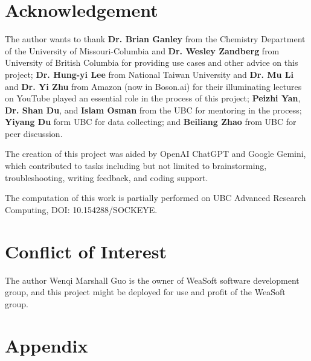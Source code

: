 \documentclass[12pt]{article}
\begin{document}
\section*{Acknowledgement}
The author wants to thank \textbf{Dr. Brian Ganley} from the Chemistry Department of the University of Missouri-Columbia and \textbf{Dr. Wesley Zandberg} from University of British Columbia for providing use cases and other advice on this project; \textbf{Dr. Hung-yi Lee} from National Taiwan University and \textbf{Dr. Mu Li} and \textbf{Dr. Yi Zhu} from Amazon (now in Boson.ai) for their illuminating lectures on YouTube played an essential role in the process of this project; \textbf{Peizhi Yan}, \textbf{Dr. Shan Du}, and \textbf{Islam Osman} from the UBC for mentoring in the process; \textbf{Yiyang Du} form UBC for data collecting; and \textbf{Beiliang Zhao} from UBC for peer discussion.


The creation of this project was aided by OpenAI ChatGPT and Google Gemini, which contributed to tasks including but not limited to brainstorming, troubleshooting, writing feedback, and coding support.

The computation of this work is partially performed on UBC Advanced Research Computing, DOI: 10.154288/SOCKEYE.
\section*{Conflict of Interest}
The author Wenqi Marshall Guo is the owner of WeaSoft software development group, and this project might be deployed for use and profit of the WeaSoft group. 
\printbibliography
\pagebreak 
\section*{Appendix}
\end{document}
